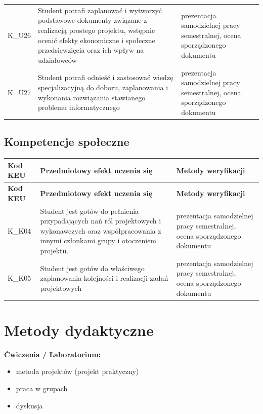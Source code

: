 \documentclass[12pt, a4paper]{article}
\newcommand{\thdrule}{\noalign{\global\setlength{\extrarowheight}{0pt}}}
\newcommand{\thdend}{\noalign{\global\setlength{\extrarowheight}{3pt}}}
\begin{document}
{\begin{longtable}{m{1.6cm}m{9.0cm}m{4.2cm}}
  \rowcolor{tableRowLight} K\_U26 & Student potrafi  zaplanować i wytworzyć podstawowe dokumenty związane z realizacją prostego projektu, wstępnie ocenić efekty ekonomiczne i społeczne przedsięwzięcia oraz ich wpływ na udziałowców & prezentacja samodzielnej pracy semestralnej, ocena sporządzonego dokumentu \\
  \rowcolor{tableRowAlt} K\_U27 & Student potrafi  odnieść i zastosować wiedzę  specjalizacyjną do doboru, zaplanowania i wykonania rozwiązania stawianego problemu informatycznego & prezentacja samodzielnej pracy semestralnej, ocena sporządzonego dokumentu \\
\bottomrule
\end{longtable}}

\subsection*{Kompetencje społeczne}
{\scriptsize
\begin{longtable}{m{1.6cm}m{9.0cm}m{4.2cm}}
\thdrule\toprule
\rowcolor{pjatkRed} {\color{white}\footnotesize\textbf{\vphantom{Ag}Kod KEU}} & {\color{white}\footnotesize\textbf{\vphantom{Ag}Przedmiotowy efekt uczenia się}} & {\color{white}\footnotesize\textbf{\vphantom{Ag}Metody weryfikacji}} \\
\midrule\thdend
\endfirsthead
\thdrule\toprule
\rowcolor{pjatkRed} {\color{white}\footnotesize\textbf{\vphantom{Ag}Kod KEU}} & {\color{white}\footnotesize\textbf{\vphantom{Ag}Przedmiotowy efekt uczenia się}} & {\color{white}\footnotesize\textbf{\vphantom{Ag}Metody weryfikacji}} \\
\midrule\thdend
\endhead
  \rowcolor{tableRowLight} K\_K04 & Student jest gotów do  pełnienia przypadających nań ról projektowych i  wykonawczych oraz współpracowania z innymi członkami grupy i otoczeniem projektu. & prezentacja samodzielnej pracy semestralnej, ocena sporządzonego dokumentu \\
  \rowcolor{tableRowAlt} K\_K05 & Student jest gotów do  właściwego zaplanowania kolejności i realizacji zadań projektowych & prezentacja samodzielnej pracy semestralnej, ocena sporządzonego dokumentu \\
\bottomrule
\end{longtable}}

\section{Metody dydaktyczne}

\textbf{Ćwiczenia / Laboratorium:}
\begin{itemize}
  \item metoda projektów (projekt praktyczny)
  \item praca w grupach
  \item dyskusja
\end{itemize}
\vspace{4pt}
\end{document}
